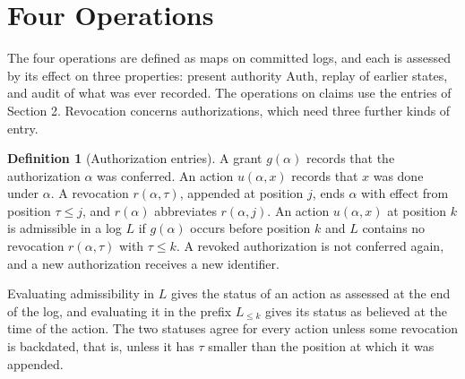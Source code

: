 \documentclass[11pt]{article}
\theoremstyle{plain}
\theoremstyle{definition}
\newtheorem{definition}{Definition}
\theoremstyle{remark}
\begin{document}
\section{Four Operations}
The four operations are defined as maps on committed logs, and each is assessed by its effect on three properties: present authority $\mathrm{Auth}$, replay of earlier states, and audit of what was ever recorded. The operations on claims use the entries of Section 2. Revocation concerns authorizations, which need three further kinds of entry.

\begin{definition}[Authorization entries]
A grant $g(\alpha)$ records that the authorization $\alpha$ was conferred. An action $u(\alpha,x)$ records that $x$ was done under $\alpha$. A revocation $r(\alpha,\tau)$, appended at position $j$, ends $\alpha$ with effect from position $\tau\le j$, and $r(\alpha)$ abbreviates $r(\alpha,j)$. An action $u(\alpha,x)$ at position $k$ is admissible in a log $L$ if $g(\alpha)$ occurs before position $k$ and $L$ contains no revocation $r(\alpha,\tau)$ with $\tau\le k$. A revoked authorization is not conferred again, and a new authorization receives a new identifier.
\end{definition}

Evaluating admissibility in $L$ gives the status of an action as assessed at the end of the log, and evaluating it in the prefix $L_{\le k}$ gives its status as believed at the time of the action. The two statuses agree for every action unless some revocation is backdated, that is, unless it has $\tau$ smaller than the position at which it was appended.
\end{document}
